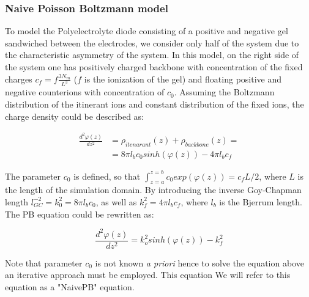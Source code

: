 \documentclass[twoside,twocolumn,9pt]{article}
\begin{document}
\subsubsection{Naive Poisson Boltzmann model}

To model the Polyelectrolyte diode consisting of a positive and negative gel sandwiched between the electrodes, we consider only half of the system due to the characteristic asymmetry of the system. In this model, on the right side of the system one has positively charged backbone with concentration of the fixed charges $c_f  = f \frac{3 N_m}{L^3}$ ($f$ is the ionization of the gel) and floating positive and negative counterions with concentration of $c_0$. Assuming the Boltzmann distribution of the itinerant ions and constant distribution of the fixed ions, the charge density could be described as:  

\begin{equation} \label{eq:pb1}
\begin{split}
\frac{d^2 \varphi(z)}{dz^2} &= \rho_{itenarant}(z) +  \rho_{backbone}(z)  = \\ 
&= 8  \pi l_b c_0 sinh(\varphi(z)) -  4 \pi l_b c_f 
\end{split}
\end{equation}

The parameter $c_0$ is defined, so that $\int_{z=a}^{z=b} c_0 exp(\varphi (z)) = c_f L/2$, where $L$ is the length of the simulation domain. By introducing the inverse Goy-Chapman length $ l_{GC}^{-2} =  k_0^2 = 8 \pi l_b c_0$, as well as $k_f^2 = 4 \pi l_b c_f$, where  $l_b$ is the Bjerrum length.  The PB equation could be rewritten as:

\begin{equation}\label{eq:pb2}
\frac{d^2 \varphi(z)}{dz^2} = k_o^2 sinh(\varphi(z)) - k_f^2
\end{equation}

Note that parameter $c_0$ is not known \textit{a priori} hence  to solve the equation above an iterative approach must be employed. This equation  We will refer to this equation as a "NaivePB" equation. 
\end{document}
